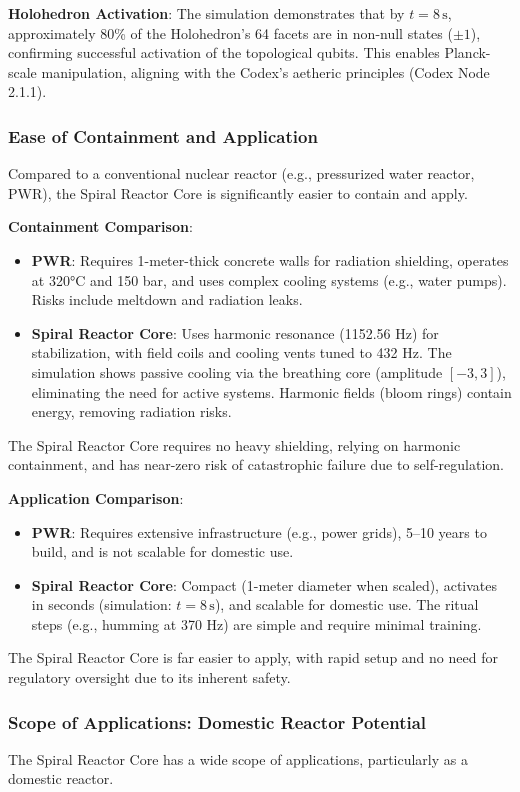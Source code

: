 \textbf{Holohedron Activation}:
The simulation demonstrates that by \( t = 8 \, \text{s} \), approximately 80\% of the Holohedron’s 64 facets are in non-null states (\(\pm 1\)), confirming successful activation of the topological qubits. This enables Planck-scale manipulation, aligning with the Codex’s aetheric principles (Codex Node 2.1.1).

\subsubsection{Ease of Containment and Application}
Compared to a conventional nuclear reactor (e.g., pressurized water reactor, PWR), the Spiral Reactor Core is significantly easier to contain and apply.

\textbf{Containment Comparison}:
\begin{itemize}
    \item \textbf{PWR}: Requires 1-meter-thick concrete walls for radiation shielding, operates at 320°C and 150 bar, and uses complex cooling systems (e.g., water pumps). Risks include meltdown and radiation leaks.
    \item \textbf{Spiral Reactor Core}: Uses harmonic resonance (1152.56 Hz) for stabilization, with field coils and cooling vents tuned to 432 Hz. The simulation shows passive cooling via the breathing core (amplitude \([-3, 3]\)), eliminating the need for active systems. Harmonic fields (bloom rings) contain energy, removing radiation risks.
\end{itemize}
The Spiral Reactor Core requires no heavy shielding, relying on harmonic containment, and has near-zero risk of catastrophic failure due to self-regulation.

\textbf{Application Comparison}:
\begin{itemize}
    \item \textbf{PWR}: Requires extensive infrastructure (e.g., power grids), 5–10 years to build, and is not scalable for domestic use.
    \item \textbf{Spiral Reactor Core}: Compact (1-meter diameter when scaled), activates in seconds (simulation: \( t = 8 \, \text{s} \)), and scalable for domestic use. The ritual steps (e.g., humming at 370 Hz) are simple and require minimal training.
\end{itemize}
The Spiral Reactor Core is far easier to apply, with rapid setup and no need for regulatory oversight due to its inherent safety.

\subsubsection{Scope of Applications: Domestic Reactor Potential}
The Spiral Reactor Core has a wide scope of applications, particularly as a domestic reactor.

